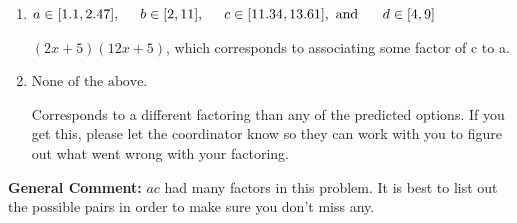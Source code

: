 \documentclass{extbook}[14pt]
\begin{document}
\begin{enumerate}
{\begin{enumerate}[label=\Alph*.]
* $(4x + 5)(6x + 5)$, which is the correct option.
\item \( a \in [1.1, 2.47], \hspace*{5mm} b \in [2, 11], \hspace*{5mm} c \in [11.34, 13.61], \text{ and } \hspace*{5mm} d \in [4, 9] \)

 $(2x + 5)(12x + 5)$, which corresponds to associating some factor of c to a.
\item \( \text{None of the above.} \)

 Corresponds to a different factoring than any of the predicted options. If you get this, please let the coordinator know so they can work with you to figure out what went wrong with your factoring.
\end{enumerate}

\textbf{General Comment:} $ac$ had many factors in this problem. It is best to list out the possible pairs in order to make sure you don't miss any.
}
\end{enumerate}
\end{document}
